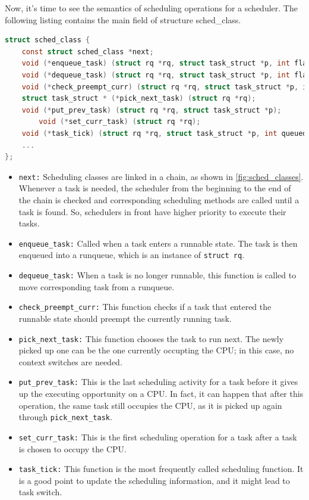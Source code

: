 Now, it's time to see the semantics of scheduling operations for a
scheduler. The following listing contains the main field of structure
sched\_class.
\begin{lstlisting}[language=C, 
		caption={\texttt{Scheduling operations for a scheduler}},
		label={sched_class}]
struct sched_class {
	const struct sched_class *next;
	void (*enqueue_task) (struct rq *rq, struct task_struct *p, int flags);
	void (*dequeue_task) (struct rq *rq, struct task_struct *p, int flags);
	void (*check_preempt_curr) (struct rq *rq, struct task_struct *p, int flags);
	struct task_struct * (*pick_next_task) (struct rq *rq);
	void (*put_prev_task) (struct rq *rq, struct task_struct *p);
        void (*set_curr_task) (struct rq *rq);
	void (*task_tick) (struct rq *rq, struct task_struct *p, int queued);
	...
};
\end{lstlisting}
\begin{itemize} 
\item \texttt{next:}
	Scheduling classes are linked in a chain, as shown 
	in \ref{fig:sched_classes}.  Whenever a task is needed,
	the scheduler from the beginning to the end of the chain 
	is checked and corresponding scheduling methods are called
	until a task is found. So, schedulers in front have higher 
	priority to execute their tasks. 
\item \texttt{enqueue\_task:}
	Called when a task enters a runnable state. The task is then 
	enqueued into a runqueue, which is an instance of \texttt{struct rq}.
\item \texttt{dequeue\_task:}
	When a task is no longer runnable, this function is called to move
	corresponding task from a runqueue.
\item \texttt{check\_preempt\_curr:}
	This function checks if a task that entered the runnable state 
	should preempt the currently running task.
\item \texttt{pick\_next\_task:}
	This function chooses the task to run next. The newly picked up
	one can be the one currently occupting the CPU; in this case,
	no context switches are needed.
\item \texttt{put\_prev\_task:}
	This is the last scheduling activity for a task before it gives
	up the executing opportunity on a CPU. In fact, it can happen
	that after this operation, the same task still occupies the 
	CPU, as it is picked up again through \texttt{pick\_next\_task}.
\item \texttt{set\_curr\_task:}
	This is the first scheduling operation for a task after a task 
	is chosen to occupy the CPU.
\item \texttt{task\_tick:}
	This function is the most frequently called scheduling function. 
	It is a good point to update the scheduling information, and 
	it might lead to task switch.
\end{itemize} 
